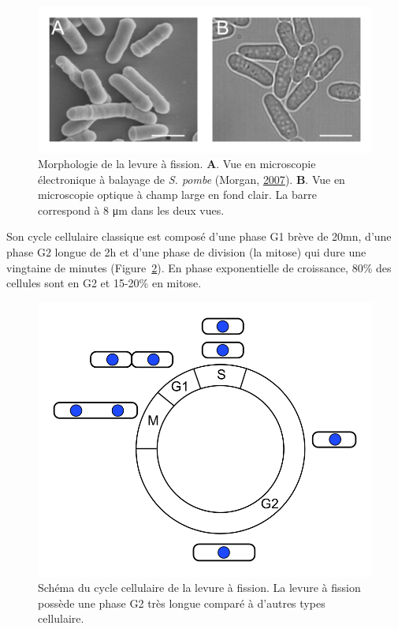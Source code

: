 \documentclass[12pt,a4paper,twoside,openright]{book}
\begin{document}
\begin{figure}[htbp]
\centering
\includegraphics{figures/intro/pombe.png}
\caption[Morphologie de la levure à fission]{\label{fig:pombe}Morphologie
de la levure à fission. \textbf{A}. Vue en microscopie électronique à
balayage de \emph{S. pombe} (Morgan, \hyperref[ref-Morgan2007]{2007}).
\textbf{B}. Vue en microscopie optique à champ large en fond clair. La
barre correspond à 8 μm dans les deux vues.}
\end{figure}

Son cycle cellulaire classique est composé d'une phase G1 brève de 20mn,
d'une phase G2 longue de 2h et d'une phase de division (la mitose) qui
dure une vingtaine de minutes (Figure~\ref{fig:pombe-cell-cycle}). En
phase exponentielle de croissance, 80\% des cellules sont en G2 et
15-20\% en mitose.

\begin{figure}[htbp]
\centering
\includegraphics{figures/intro/pombe_cell_cycle.png}
\caption[Schéma du cycle cellulaire de la levure à fission]{\label{fig:pombe-cell-cycle}Schéma
du cycle cellulaire de la levure à fission. La levure à fission possède
une phase G2 très longue comparé à d'autres types cellulaire.}
\end{figure}
\end{document}

